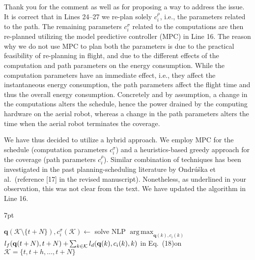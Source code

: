 \documentclass[10pt]{letter}
\DeclareMathOperator*{\argmax}{arg\,max}
\newenvironment{formal}{%
  \def\FrameCommand{%
    \hspace{1pt}%
    {\color{red}\vrule width 2pt}%
    {\color{formalshade}\vrule width 4pt}%
    \colorbox{formalshade}%
  }%
  \MakeFramed{\advance\hsize-\width\FrameRestore}%
  \noindent\hspace{-4.55pt}%
  \begin{adjustwidth}{}{7pt}%
  \vspace{2pt}\vspace{2pt}%
}
{%
  \vspace{2pt}\end{adjustwidth}\endMakeFramed%
}
\begin{document}
{\color{blue} 

{\hspace*{-4.5em}{[R1:2]}\vspace*{-1.9em}}

Thank you for the comment as well as for proposing a way to address the issue. It is correct that in Lines 24--27 we re-plan solely $c_i^\rho$, i.e., the parameters related to the path. The remaining parameters $c_i^\sigma$ related to the computations are then re-planned utilizing the model predictive controller (MPC) in Line 16. The reason why we do not use MPC to plan both the parameters is due to the practical feasibility of re-planning in flight, %
and due to the different effects of the computation and path parameters on the energy consumption. While the computation parameters have an immediate effect, i.e., they affect the instantaneous energy consumption, the path parameters affect the flight time and thus the overall energy consumption. Concretely and by assumption, a change in the computations alters the schedule, hence the power drained by the computing hardware on the aerial robot, whereas a change in the path parameters alters the time when the aerial robot terminates the coverage.

We have thus decided to utilize a hybrid approach. We employ MPC for the schedule (computation parameters $c_i^\sigma$) and a heuristics-based greedy approach for the coverage (path parameters $c_i^\rho$). Similar combination of techniques has been investigated in the past planning-scheduling literature by Ondr\'{u}\v{s}ka et al.~(reference [{\color{green}17}] in the revised manuscript).
Nonetheless, as underlined in your observation, this was not clear from the text. We have updated the algorithm in Line 16.

\begin{formal}
\begin{algorithmic}[1]
  \small
    \makeatletter
    \setcounter{ALC@line}{15}
    \makeatother
    \color{blue}\STATE $\mathbf{q}(\mathcal{K}\setminus\{t+N\}),c_i^\sigma(\mathcal{K})\gets${ \vspace*{.3ex}solve NLP }$\argmax_{\mathbf{q}(k),c_i(k)}$\newline \vspace*{.7ex}\hspace*{1em}${l_f(\mathbf{q}(t+\hspace*{-.1ex}N),t+\hspace*{-.1ex}N)}+\hspace*{-.2ex}{\sum_{k\in\mathcal{K}}{l_d(\mathbf{q}(k),c_i(k),k)}}${ in Eq.~({\color{red}18})\newline \hspace*{1em}on }$\mathcal{K}=\{t,t+h,\dots,t+N\}$\vspace*{.3ex}
      

\end{algorithmic}
\end{formal}}
\end{document}
